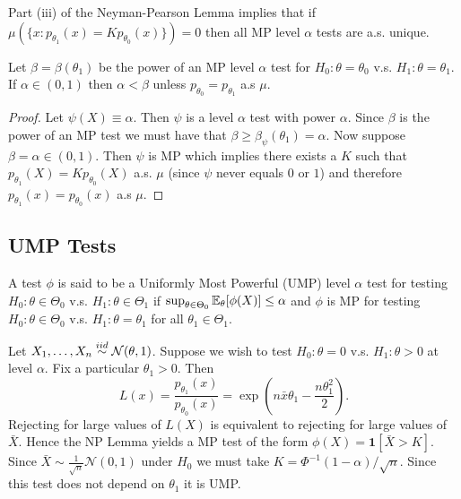 \begin{remark} \label{rmk:np-remark}
	Part (iii) of the Neyman-Pearson Lemma implies that if $\mu(\{x : p_{\theta_1}(x) = K p_{\theta_0}(x)\}) = 0$ then all MP level $\alpha$ tests are a.s. unique.
\end{remark}

\begin{corollary} \label{corr:np-corr}
	Let $\beta = \beta(\theta_1)$ be the power of an MP level $\alpha$ test for $H_0 : \theta = \theta_0$ v.s. $H_1 : \theta = \theta_1$. If $\alpha \in (0, 1)$ then $\alpha < \beta$ unless $p_{\theta_0} = p_{\theta_1}$ a.s $\mu$. 
\end{corollary}

\begin{proof}
	Let $\psi(X) \equiv \alpha$. Then $\psi$ is a level $\alpha$ test with power $\alpha$. Since $\beta$ is the power of an MP test we must have that $\beta \geq \beta_{\psi}(\theta_1) = \alpha$. Now suppose $\beta = \alpha \in (0, 1)$. Then $\psi$ is MP which implies there exists a $K$ such that  $p_{\theta_1}(X) = Kp_{\theta_0}(X)$ a.s. $\mu$ (since $\psi$ never equals $0$ or $1$) and therefore $p_{\theta_1}(x) = p_{\theta_0}(x)$ a.s $\mu$.
\end{proof}


\subsection{UMP Tests}
\begin{definition}
	A test $\phi$ is said to be a Uniformly Most Powerful (UMP) level $\alpha$ test for testing $H_0 : \theta \in \Theta_0$ v.s. $H_1 : \theta \in \Theta_1$ if $\sup_{\theta \in \Theta_0} \mathbb{E}_{\theta}[\phi(X)] \le \alpha$ and $\phi$ is MP for testing $H_0 : \theta \in \Theta_0$ v.s. $H_1 : \theta = \theta_1$ for all $\theta_1 \in \Theta_1$. 
\end{definition}

\begin{example}
	Let $X_1, \dots, X_n \overset{iid}{\sim} \mathcal{N}(\theta, 1)$. Suppose we wish to test $H_0 : \theta = 0$ v.s. $H_1 : \theta > 0$ at level $\alpha$. Fix a particular $\theta_1 > 0$. Then \[
		L(x) = \frac{p_{\theta_1}(x)}{p_{\theta_0}(x)} = \exp\left({n \bar x \theta_1 - \frac{n\theta_1^2}{2}}\right).
	\] Rejecting for large values of $L(X)$ is equivalent to rejecting for large values of $\bar X$. Hence the NP Lemma yields a MP test of the form $\phi(X) = \mathbf{1}[\bar X > K]$. Since $\bar X \sim \frac{1}{\sqrt{n}}\mathcal{N}(0, 1)$ under $H_0$ we must take $K = \Phi^{-1}(1-\alpha) / \sqrt{n}$. Since this test does not depend on $\theta_1$ it is UMP.
\end{example}


